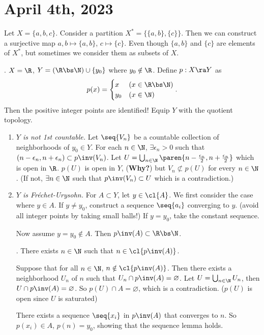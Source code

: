 \section*{April 4th, 2023}

Let \(X = \{a, b, c\}\). Consider a partition \(X^* = \{\{a, b\}, \{c\}\}\). Then we can construct a surjective map \(a, b \mapsto \{a, b\}\), \(c \mapsto \{c\}\). Even though \(\{a, b\}\) and \(\{c\}\) are elements of \(X^*\), but sometimes we consider them as subsets of \(X\).

\ex. \(X = \R\), \(Y = (\R \bs \N) \cup \{y_0\}\) where \(y_0 \notin \R\). Define \(p : X \ra Y\) as
\[
    p(x) = \begin{cases}
        x & (x \in \R \bs \N) \\ y_0 & (x \in \N)
    \end{cases}.
\]
Then the positive integer points are identified! Equip \(Y\) with the quotient topology.
\begin{enumerate}
    \item \textit{\(Y\) is not 1st countable.} Let \(\seq{V_n}\) be a countable collection of neighborhoods of \(y_0 \in Y\). For each \(n \in \N\), \(\exists \epsilon_n > 0\) such that \((n - \epsilon_n, n + \epsilon_n) \subset p\inv(V_n)\). Let \(U = \bigcup_{n \in \N} \paren{n - \frac{\epsilon_n}{2}, n + \frac{\epsilon_n}{2}}\) which is open in \(\R\). \(p(U)\) is open in \(Y\), (\textbf{Why?}) but \(V_n \not\subset p(U)\) for every \(n \in \N\). (If not, \(\exists n \in \N\) such that \(p\inv(V_n) \subset U\) which is a contradiction.)
    \item \textit{\(Y\) is Fréchet-Urysohn.} For \(A \subset Y\), let \(y \in \cl{A}\). We first consider the case where \(y \in A\). If \(y \neq y_0\), construct a sequence \(\seq{a_i}\) converging to \(y\). (avoid all integer points by taking small balls!) If \(y = y_0\), take the constant sequence.

          Now assume \(y = y_0 \notin A\). Then \(p\inv(A) \subset \R \bs \N\).

          \quad \claim. There exists \(n \in \N\) such that \(n \in \cl{p\inv(A)}\).

          \quad \pf Suppose that for all \(n \in \N\), \(n \notin \cl{p\inv(A)}\). Then there exists a neighborhood \(U_n\) of \(n\) such that \(U_n \cap p\inv(A) = \varnothing\). Let \(U = \bigcup_{n \in \N} U_n\), then \(U \cap p\inv(A) = \varnothing\). So \(p(U) \cap A= \varnothing\), which is a contradiction. (\(p(U)\) is open since \(U\) is saturated)


          There exists a sequence \(\seq{x_i}\) in \(p\inv(A)\) that converges to \(n\). So \(p(x_i) \in A\), \(p(n) = y_0\), showing that the sequence lemma holds.
\end{enumerate}

